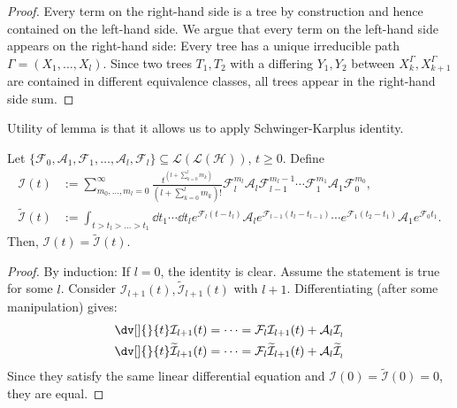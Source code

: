 \begin{proof}
    Every term on the right-hand side is a tree by construction and hence contained on the left-hand side. We argue that every term on the left-hand side appears on the right-hand side: Every tree has a unique irreducible path \(\Gamma =(X_{1},\dots, X_l)\). Since two trees \(T_1,T_2\) with a differing \(Y_1, Y_2\) between \(X_k^{\Gamma }, X_{k+1}^{\Gamma }\) are contained in different equivalence classes, all trees appear in the right-hand side sum.
\end{proof}


\begin{remark}[]
    Utility of lemma is that it allows us to apply Schwinger-Karplus identity.
\end{remark}


\begin{prop}
  Let \(\{\mathcal{F}_0,\mathcal{A}_1,\mathcal{F}_1, \dots, \mathcal{A}_l,\mathcal{F}_l\} \subseteq  \mathcal{L}(\mathcal{L}(\mathcal{H}))\), \(t \geq 0\). Define 
  \begin{align*}
    \mathcal{I}(t)&:= \sum_{m_0,\dots, m_l=0}^{\infty} \frac{t^{ \left(l+\sum_{k=0}^{l} m_k \right)}}{ \left(l+\sum_{k=0}^{l} m_k \right)!} \mathcal{F}_{l}^{m_l}\mathcal{A}_l \mathcal{F}_{l-1}^{m_l-1}\cdots \mathcal{F}_1^{m_1}\mathcal{A}_1 \mathcal{F}_0^{m_0}, \\
    \widetilde{\mathcal{I}}(t)&:= \int_{t>t_l>\dots > t_1}^{}   \dd{t_1} \cdots \dd{t_l} e^{\mathcal{F}_l(t-t_l)} \mathcal{A}_l e^{\mathcal{F}_{l-1}(t_l-t_{l-1})}\cdots e^{\mathcal{F}_1(t_2-t_1)}\mathcal{A}_1e^{\mathcal{F}_0t_1}.
  \end{align*}
  Then, \(\mathcal{I}(t)=\widetilde{\mathcal{I}}(t)\).
\end{prop}


\begin{proof}
    By induction: If \(l=0\), the identity is clear. Assume the statement is true for some \(l\). Consider \(\mathcal{I}_{l+1}(t),\widetilde{\mathcal{I}}_{l+1}(t)\) with \(l+1\). Differentiating (after some manipulation) gives:
    \begin{align*}
      \dv[]{}{t}\mathcal{I}_{l+1}(t)&=\dots = \mathcal{F}_{l}\mathcal{I}_{l+1}(t)+\mathcal{A}_{l}\mathcal{I}_{_l} \\
      \dv[]{}{t}\widetilde{\mathcal{I}}_{l+1}(t)&=\dots = \mathcal{F}_{l}\widetilde{\mathcal{I}}_{l+1}(t)+\mathcal{A}_{l}\widetilde{\mathcal{I}}_{_l}
    \end{align*}
   Since they satisfy the same linear differential equation and \(\mathcal{I}(0)=\widetilde{\mathcal{I}}(0)=0\), they are equal.
\end{proof}


